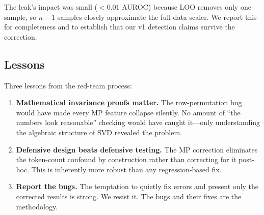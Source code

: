 The leak's impact was small ($< 0.01$ AUROC) because LOO removes only one
sample, so $n-1$ samples closely approximate the full-data scaler. We
report this for completeness and to establish that our v1 detection claims
survive the correction.

\subsection{Lessons}

Three lessons from the red-team process:

\begin{enumerate}[nosep]
  \item \textbf{Mathematical invariance proofs matter.} The row-permutation
    bug would have made every MP feature collapse silently. No amount of
    ``the numbers look reasonable'' checking would have caught it---only
    understanding the algebraic structure of SVD revealed the problem.
  \item \textbf{Defensive design beats defensive testing.} The MP
    correction eliminates the token-count confound by construction rather
    than correcting for it post-hoc. This is inherently more robust than
    any regression-based fix.
  \item \textbf{Report the bugs.} The temptation to quietly fix errors and
    present only the corrected results is strong. We resist it. The bugs
    and their fixes are the methodology.
\end{enumerate}
